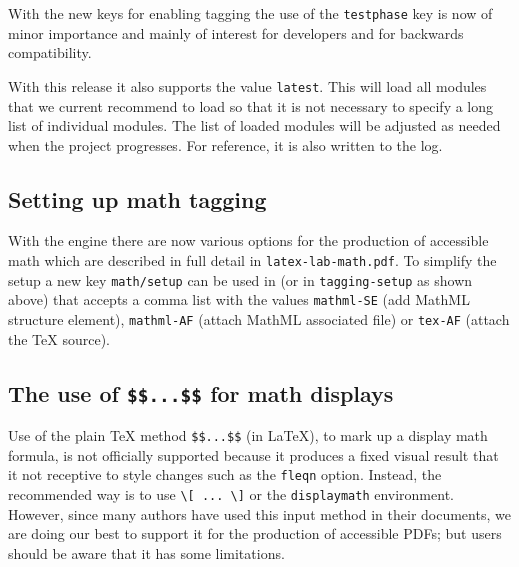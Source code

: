 \documentclass{ltnews}
\providecommand\env[1]{\texttt{#1}}
\providecommand\LuaTeX{\hologo{LuaTeX}}
\providecommand\env[1]{\texttt{#1}}
\begin{document}
With the new keys for enabling tagging the use of the
\texttt{testphase} key is now of minor importance and mainly of
interest for developers and for backwards compatibility.

With this release it also supports the value \texttt{latest}.  This
will load all modules that we current recommend to load so that it is not necessary to
specify a long list of individual modules. The list of loaded modules
will be adjusted as needed when the project progresses. For reference,
it is also written to the log.



\subsection{Setting up math tagging}

With the \LuaTeX{} engine there are now various options for the production of
accessible math 
which are described in full detail in \texttt{latex-lab-math.pdf}. To
simplify the setup 
a new key \texttt{math/setup} can be used in
 (or in \texttt{tagging-setup} as shown above)
that accepts a comma list with the values
\texttt{mathml-SE} (add MathML structure element), \texttt{mathml-AF}
(attach MathML associated file) or \texttt{tex-AF} (attach the \TeX{}
source).


\subsection{The use of \texttt{\$\$...\$\$} for math displays}

Use of the plain \TeX{} method \verb=$$...$$= (in \LaTeX{}), to mark up a
display math formula, is not officially supported because it produces a
fixed visual result that it not receptive to style changes such as the
\texttt{fleqn} option. Instead, the recommended way is to use
\verb=\[ ... \]= or the \env{displaymath} environment. However, since many
authors %
have used this input method in their documents, we are doing our best to
support it for the production of accessible PDFs; but users should be
aware that it has some limitations.
\end{document}
